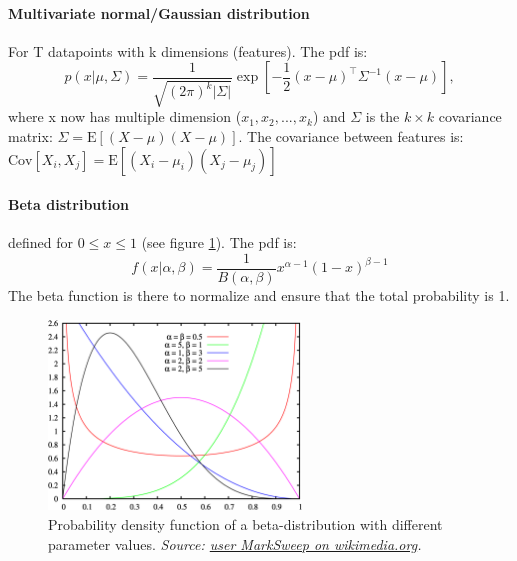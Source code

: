\documentclass[../main.tex]{subfiles}
\begin{document}
        \paragraph{Multivariate normal/Gaussian distribution} For T datapoints with k dimensions (features). The pdf is:
            $$p(x|\mu,\Sigma) = \dfrac{1}{\sqrt{(2\pi)^k|\Sigma|}}\exp\left[-\dfrac{1}{2}(x-\mu)^\top\Sigma^{-1}(x-\mu)\right], $$  where x now has multiple dimension ($x_1, x_2, ..., x_k$) and $\Sigma$ is the $k \times k$ covariance matrix: $\Sigma = \text{E}[(X-\mu)(X-\mu)]$. The covariance between features is: $\text{Cov}[X_i, X_j] = \text{E}[(X_i-\mu_i)(X_j-\mu_j)]$

        \paragraph{Beta distribution}  defined for $0 \leq x \leq 1$ (see figure \ref{Beta_distr}). The pdf is: $$f(x|\alpha, \beta) = \frac{1}{B(\alpha,\beta)}x^{\alpha-1}(1-x)^{\beta-1}$$ The beta function is there to normalize and ensure that the total probability is 1.
                \begin{figure}
                    \centering
                    \includegraphics[width=0.6\textwidth]{../figures/Beta_distribution_pdf.png}
                    \caption{Probability density function of a beta-distribution with different parameter values. \textit{Source: \href{https://commons.wikimedia.org/wiki/File:Beta_distribution_pdf.png}{user MarkSweep on wikimedia.org}.}}
                    \label{Beta_distr}
                \end{figure}
\end{document}
